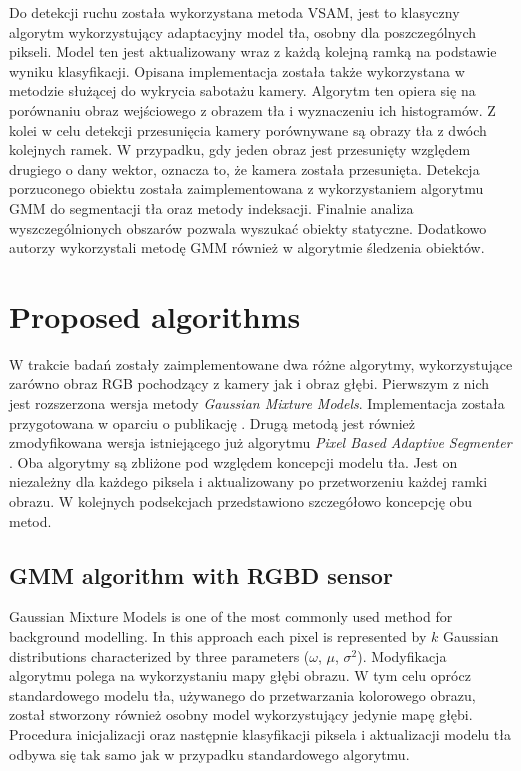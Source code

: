 \documentclass[b5paper,10pt,twoside]{article}
\begin{document}
{Do detekcji ruchu została wykorzystana metoda VSAM, jest to klasyczny algorytm wykorzystujący adaptacyjny model  tła, osobny dla poszczególnych pikseli. Model ten jest aktualizowany wraz z każdą kolejną ramką na podstawie wyniku klasyfikacji. Opisana implementacja została także wykorzystana w metodzie służącej do wykrycia sabotażu kamery. Algorytm ten opiera się na porównaniu obraz wejściowego z obrazem tła i wyznaczeniu ich histogramów. Z kolei w celu detekcji przesunięcia kamery porównywane są obrazy tła z dwóch kolejnych ramek. W przypadku, gdy jeden obraz jest przesunięty względem drugiego o dany wektor, oznacza to, że kamera została przesunięta. Detekcja porzuconego obiektu została zaimplementowana z wykorzystaniem algorytmu GMM do segmentacji tła oraz metody indeksacji. Finalnie analiza wyszczególnionych obszarów pozwala wyszukać obiekty statyczne. Dodatkowo autorzy wykorzystali metodę GMM również w algorytmie śledzenia obiektów.


\section{Proposed algorithms}

W trakcie badań zostały zaimplementowane dwa różne algorytmy, wykorzystujące zarówno obraz RGB pochodzący z kamery jak i obraz głębi. Pierwszym z nich jest rozszerzona wersja metody \textit{Gaussian Mixture Models}. Implementacja została przygotowana w oparciu o publikację \cite{}. Drugą metodą jest również zmodyfikowana wersja istniejącego już algorytmu \textit{Pixel Based Adaptive Segmenter} \cite{}. Oba algorytmy są zbliżone pod względem koncepcji modelu tła. Jest on niezależny dla każdego piksela i aktualizowany po przetworzeniu każdej ramki obrazu. W kolejnych podsekcjach przedstawiono szczegółowo koncepcję obu metod. 

\subsection{GMM algorithm with RGBD sensor}
\label{subsec:gmm_rgbd}

Gaussian Mixture Models is one of the most commonly used method for background modelling. 
In this approach each pixel is represented by $k$ Gaussian distributions characterized by three parameters ($\omega$, $\mu$, $\sigma^2$). Modyfikacja algorytmu polega na wykorzystaniu mapy głębi obrazu. W tym celu oprócz standardowego modelu tła, używanego do przetwarzania kolorowego obrazu, został stworzony również osobny model wykorzystujący jedynie mapę głębi. Procedura inicjalizacji oraz następnie klasyfikacji piksela i aktualizacji modelu tła odbywa się tak samo jak w przypadku standardowego algorytmu. 

}
\end{document}
